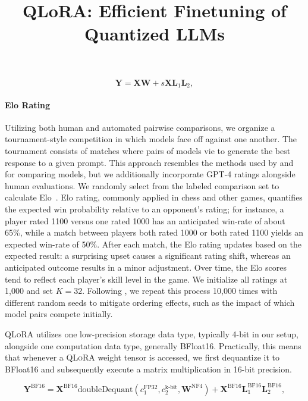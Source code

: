 \title{QLoRA: Efficient Finetuning of Quantized LLMs}
\begin{equation}
    \mathbf{Y} = \mathbf{X}\mathbf{W} + s\mathbf{X}\mathbf{L}_1\mathbf{L}_2,
\end{equation}

\paragraph{Elo Rating} Utilizing both human and automated pairwise comparisons, we organize a tournament-style competition in which models face off against one another. The tournament consists of matches where pairs of models vie to generate the best response to a given prompt. This approach resembles the methods used by \citet{bai2022training} and \citet{vicuna2023} for comparing models, but we additionally incorporate GPT-4 ratings alongside human evaluations. We randomly select from the labeled comparison set to calculate Elo~\citep{elo1967proposed,elo1978rating}. Elo rating, commonly applied in chess and other games, quantifies the expected win probability relative to an opponent's rating; for instance, a player rated 1100 versus one rated 1000 has an anticipated win-rate of about 65\%, while a match between players both rated 1000 or both rated 1100 yields an expected win-rate of 50\%. After each match, the Elo rating updates based on the expected result: a surprising upset causes a significant rating shift, whereas an anticipated outcome results in a minor adjustment. Over time, the Elo scores tend to reflect each player’s skill level in the game. We initialize all ratings at 1,000 and set $K=32$. Following \citet{vicuna2023}, we repeat this process 10,000 times with different random seeds to mitigate ordering effects, such as the impact of which model pairs compete initially.

\textsc{QLoRA} utilizes one low-precision storage data type, typically 4-bit in our setup, alongside one computation data type, generally BFloat16. Practically, this means that whenever a \textsc{QLoRA} weight tensor is accessed, we first dequantize it to BFloat16 and subsequently execute a matrix multiplication in 16-bit precision.

\begin{equation}
    \mathbf{Y}^{\text{BF16}} =  \mathbf{X}^{\text{BF16}} \text{doubleDequant}(c_1^{\text{FP32}}, c_2^{\text{k-bit}}, \mathbf{W}^{\text{NF4}}) + \mathbf{X}^{\text{BF16}}\mathbf{L}^{\text{BF16}}_1\mathbf{L}^{\text{BF16}}_2,
\end{equation}

